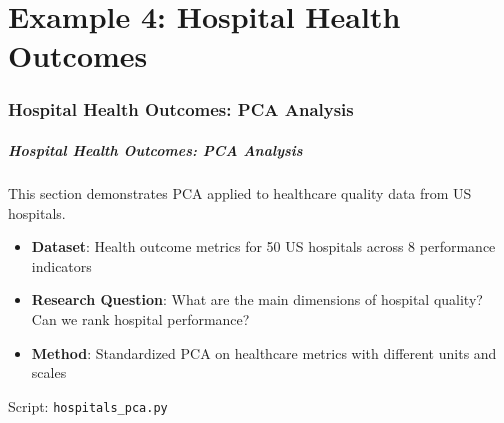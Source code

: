 \documentclass[aspectratio=169]{beamer}
\begin{document}

\part{Example 4: Hospital Health Outcomes}

\begin{frame}
    \partpage
\end{frame}

\section{Hospital Health Outcomes: PCA Analysis}

\begin{frame}
    \frametitle{Hospital Health Outcomes: PCA Analysis}
    This section demonstrates PCA applied to healthcare quality data from US hospitals.
    \begin{itemize}
        \item \textbf{Dataset}: Health outcome metrics for 50 US hospitals across 8 performance indicators \pause
        \item \textbf{Research Question}: What are the main dimensions of hospital quality? Can we rank hospital performance? \pause
        \item \textbf{Method}: Standardized PCA on healthcare metrics with different units and scales \pause
    \end{itemize}
    \vspace{6pt}
    Script: \texttt{hospitals\_pca.py}
\end{frame}
\end{document}
